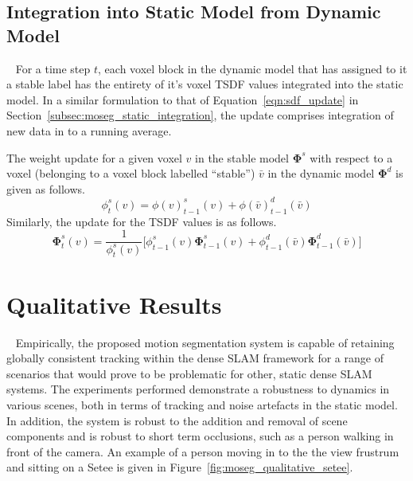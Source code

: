 \subsection{Integration into Static Model from Dynamic Model}
~\label{sub:moseg_static_to_dynamic}
For a time step \(t\), each voxel block in the dynamic model that has assigned to
it a stable label has the entirety of it's voxel TSDF values integrated into the
static model. In a similar formulation to that of Equation~\ref{eqn:sdf_update}
in Section~\ref{subsec:moseg_static_integration}, the update comprises 
integration of new data in to a running average.

The weight update for a given voxel \(v\) in the stable model \(\bm{\Phi}^{s}\)
with respect to a voxel (belonging to a voxel block labelled ``stable'') 
\(\bar{v}\) in the dynamic model \(\bm{\Phi}^{d}\) is given as follows.
\begin{equation}
  \label{eqn:moseg_weight_update}
  \phi^{s}_{t}(v) = \phi{(v)}^{s}_{t-1}(v) + \phi{(\bar{v})}^{d}_{t-1}(\bar{v})
\end{equation}
Similarly, the update for the TSDF values is as follows.
\begin{equation}
  \label{eqn:moseg_sdf_update}
  \bm{\Phi}^{s}_{t}(v) = \frac{1}{\phi^{s}_{t}(v)} \bigg[
  \phi^{s}_{t-1}(v) \bm{\Phi}^{s}_{t-1}(v) +
  \phi^{d}_{t-1}(\bar{v}) \bm{\Phi}^{d}_{t-1}(\bar{v})
  \bigg]
\end{equation}

\section{Qualitative Results}
~\label{sec:moseg_qualitative}
Empirically, the proposed motion segmentation system is capable of retaining
globally consistent tracking within the dense SLAM framework for a range of
scenarios that would prove to be problematic for other, static dense SLAM
systems. The experiments performed demonstrate a robustness	to dynamics in
various scenes, both in terms of tracking and noise artefacts in the static
model. In addition, the system is robust to the addition and removal of scene
components and is robust to short term occlusions, such as a person walking in
front of the camera. An example of a person moving in to the the view frustrum
and sitting on a Setee is given in Figure~\ref{fig:moseg_qualitative_setee}.

